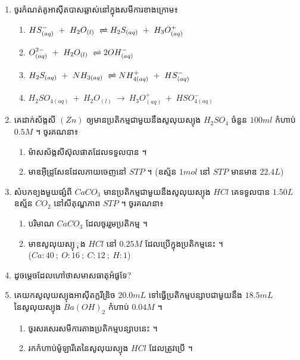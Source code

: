 \documentclass[a4paper]{report}
\begin{document}
\begin{enumerate}[1]
\begin{multicols}{5}
\begin{enumerate}[a]
				\item $OH^{-}$
				\item $C_2H_5NH_2$
				\item $CH_3COOH$
				\item $H_3O^{+}$
			\end{enumerate}
		\end{multicols}
		\item ចូរកំណត់គូអាស៊ីតបាសឆ្លាស់នៅក្នុងសមីការខាងក្រោម៖
		\begin{enumerate}[a]
			\item $HS_{(aq)}^{-}~+~H_2O_{(l)}~\xrightleftharpoons~H_2S_{(aq)}~+~H_3O_{(aq)}^{+}$
			\item $O_{(aq)}^{2-}~+~H_2O_{(l)}~\xrightleftharpoons~2OH_{(aq)}^{-}$
			\item $H_2S_{(aq)}~+~NH_{3(aq)}~\xrightleftharpoons~NH_{4(aq)}^+~+~HS_{(aq)}^-$
			\item $H_2SO_{4(aq)}~+~H_2O_{(l)}~\rightarrow~H_3O_{(aq)}^+~+~HSO_{4(aq)}^-$
		\end{enumerate}
		\newpage
		\item គេដាក់ស័ង្កសី $(Zn)$ ឲ្យមានប្រតិកម្មជាមួយនឹងសូលុយស្យុង $H_2SO_4$ ចំនួន $100ml$ កំហាប់ $0.5M$ ។ ចូរគណនា៖
		\begin{enumerate}[a]
			\item ម៉ាសស័ង្កសីស៊ុលផាតដែលទទួលបាន ។
			\item មាឌអ៊ីដ្រូសែនដែលភាយចេញនៅ $STP$ ។ (ឧស្ម័ន $1mol$ នៅ $STP$ មានមាឌ $22.4L$) 
		\end{enumerate}
		\item សំបកខ្យងមួយផ្សំពី $CaCO_3$ មានប្រតិកម្មជាមួយនឹងសូលុយស្យុង $HCl$ គេទទួលបាន $1.50L$ ឧស្ម័ន $CO_2$ នៅសីតុណ្ហភាព $STP$ ។ ចូរគណនា៖ 
		\begin{enumerate}[a]
			\item បរិមាណ $CaCO_3$ ដែលចូររួមប្រតិកម្ម ។
			\item មាឌសូលុយស្យុុង $HCl$ នៅ $0.25M$ ដែលប្រើក្នុងប្រតិកម្មនេះ ។\\
			($Ca:40~;~O:16~;~C:12~;~H:1$) 
		\end{enumerate}
		\item ដូចម្តេចដែលហៅថាសមាសធាតុអំផូទែ?
		\item គេយកសូលុយស្យុងអាស៊ីតក្លរីឌ្រិច $20.0mL$ ទៅធ្វើប្រតិកម្មបន្សាបជាមួយនឹង $18.5mL$ នៃសូលុយស្យុង $Ba(OH)_2$ កំហាប់ $0.04M$ ។
		\begin{enumerate}[a]
			\item ចូរសរសេរសមីការតាងប្រតិកម្មបន្សាបនេះ ។
			\item រកកំហាប់ម៉ូឡារីតេនៃសូលុយស្យុង $HCl$ ដែលត្រូវប្រើ ។

\end{enumerate}
\end{enumerate}
\end{document}
